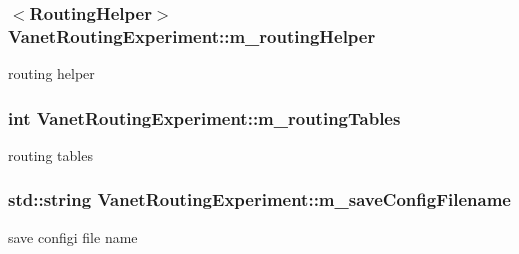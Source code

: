 \subsubsection[{\texorpdfstring{m\+\_\+routing\+Helper}{m_routingHelper}}]{$<${\bf Routing\+Helper}$>$ Vanet\+Routing\+Experiment\+::m\+\_\+routing\+Helper\hspace{0.3cm}{\ttfamily [private]}}\hypertarget{classVanetRoutingExperiment_afbd666dc1310ae1903438ab9073409d5}{}\label{classVanetRoutingExperiment_afbd666dc1310ae1903438ab9073409d5}


routing helper 

\subsubsection[{\texorpdfstring{m\+\_\+routing\+Tables}{m_routingTables}}]{\setlength{\rightskip}{0pt plus 5cm}int Vanet\+Routing\+Experiment\+::m\+\_\+routing\+Tables\hspace{0.3cm}{\ttfamily [private]}}\hypertarget{classVanetRoutingExperiment_ade07fe0bee115e9dbcd4765ba8754522}{}\label{classVanetRoutingExperiment_ade07fe0bee115e9dbcd4765ba8754522}


routing tables 

\subsubsection[{\texorpdfstring{m\+\_\+save\+Config\+Filename}{m_saveConfigFilename}}]{\setlength{\rightskip}{0pt plus 5cm}std\+::string Vanet\+Routing\+Experiment\+::m\+\_\+save\+Config\+Filename\hspace{0.3cm}{\ttfamily [private]}}\hypertarget{classVanetRoutingExperiment_a3d40ad17251882382e33f8438940c82e}{}\label{classVanetRoutingExperiment_a3d40ad17251882382e33f8438940c82e}


save configi file name 

